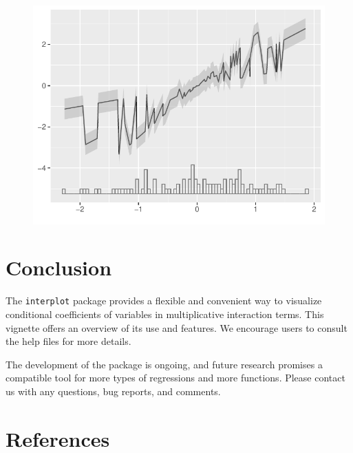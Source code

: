 \documentclass[
  article]{jss}
\begin{document}
\begin{figure}[H]

{\centering \includegraphics{jss_manuscript_files/figure-pdf/unnamed-chunk-20-1.pdf}

}

\end{figure}

\hypertarget{sec-conclusion}{%
\section{Conclusion}\label{sec-conclusion}}

The \texttt{interplot} package provides a flexible and convenient way to
visualize conditional coefficients of variables in multiplicative
interaction terms. This vignette offers an overview of its use and
features. We encourage users to consult the help files for more details.

The development of the package is ongoing, and future research promises
a compatible tool for more types of regressions and more functions.
Please contact us with any questions, bug reports, and comments.

\hypertarget{sec-references}{%
\section*{References}\label{sec-references}}

\renewcommand{\bibsection}{}

\end{document}
